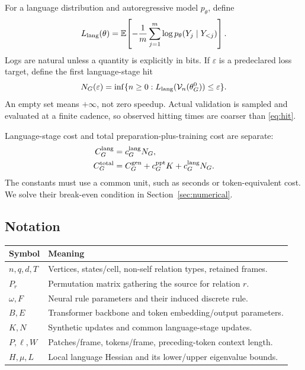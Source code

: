 For a language distribution and autoregressive model $p_\theta$, define
\begin{equation}
 L_{\rm lang}(\theta)
 =\mathbb{E}\!\left[-\frac{1}{m}\sum_{j=1}^{m}
       \log p_\theta(Y_j\mid Y_{<j})\right].
\end{equation}
Logs are natural unless a quantity is explicitly in bits.
If $\varepsilon$ is a predeclared loss target, define the first
language-stage hit
\begin{equation}
 N_G(\varepsilon)=\inf\{n\geq0:L_{\rm lang}(\mathcal V_n(\theta_G^0))
                               \leq\varepsilon\}.
 \label{eq:hit}
\end{equation}
An empty set means $+\infty$, not zero speedup. Actual validation is
sampled and evaluated at a finite cadence, so observed hitting times are
coarser than \eqref{eq:hit}.

Language-stage cost and total preparation-plus-training cost are separate:
\begin{align}
 C_G^{\rm lang}&=c_G^{\rm lang}N_G,\\
 C_G^{\rm total}&=C_G^{\rm gen}+c_G^{\rm ppt}K+
                         c_G^{\rm lang}N_G.
 \label{eq:twocosts}
\end{align}
The constants must use a common unit, such as seconds or token-equivalent
cost. We solve their break-even condition in Section~\ref{sec:numerical}.

\subsection{Notation}

\begin{center}
\begin{tabular}{@{}p{.20\linewidth}p{.73\linewidth}@{}}
\toprule
Symbol & Meaning\\
\midrule
$n,q,d,T$ & Vertices, states/cell, non-self relation types, retained frames.\\
$P_r$ & Permutation matrix gathering the source for relation $r$.\\
$\omega,F$ & Neural rule parameters and their induced discrete rule.\\
$B,E$ & Transformer backbone and token embedding/output parameters.\\
$K,N$ & Synthetic updates and common language-stage updates.\\
$P,\ell,W$ & Patches/frame, tokens/frame, preceding-token context length.\\
$H,\mu,L$ & Local language Hessian and its lower/upper eigenvalue bounds.\\
\bottomrule
\end{tabular}
\end{center}

